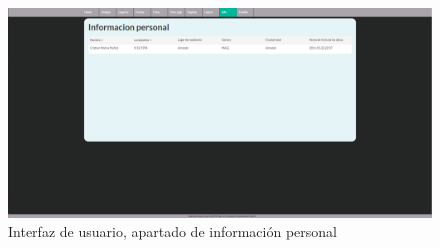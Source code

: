 \begin{figure}
	\begin{center}
		\includegraphics[scale=0.3]{Imagenes/Fuentes/InterfazInfo.png} \caption{Interfaz de usuario, apartado de información personal}
		\label{WebAplication10}
	\end{center}
\end{figure}

 \newpage
